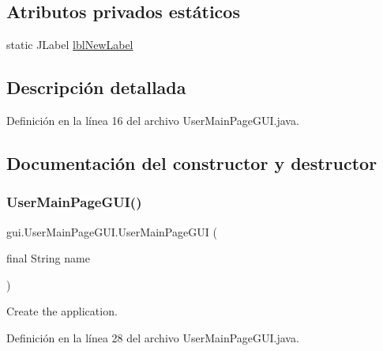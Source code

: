 \subsection*{Atributos privados estáticos}
\begin{DoxyCompactItemize}
\item 
static J\+Label \mbox{\hyperlink{classgui_1_1UserMainPageGUI_a37ba4e20b066f143ee60d0d4e47656dd}{lbl\+New\+Label}}
\end{DoxyCompactItemize}


\subsection{Descripción detallada}


Definición en la línea 16 del archivo User\+Main\+Page\+G\+U\+I.\+java.



\subsection{Documentación del constructor y destructor}
\mbox{\label{classgui_1_1UserMainPageGUI_a25a280353dd2dba519823577052d559d}} 
\subsubsection{\texorpdfstring{UserMainPageGUI()}{UserMainPageGUI()}}
{\footnotesize\ttfamily gui.\+User\+Main\+Page\+G\+U\+I.\+User\+Main\+Page\+G\+UI (\begin{DoxyParamCaption}\item[{final String}]{name }\end{DoxyParamCaption})}

Create the application. 

Definición en la línea 28 del archivo User\+Main\+Page\+G\+U\+I.\+java.


